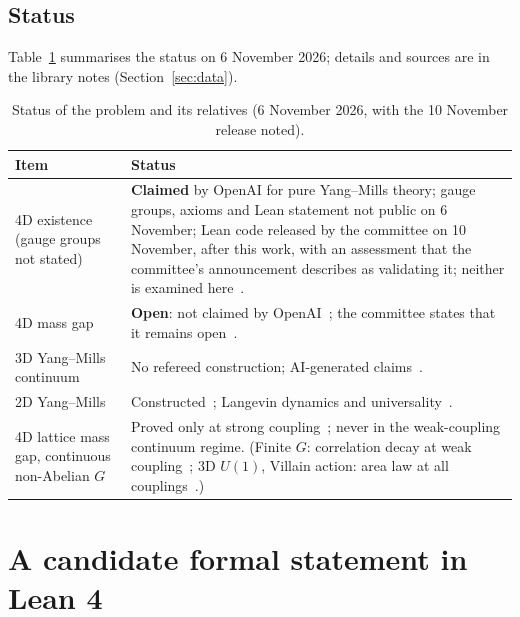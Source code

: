 \documentclass[11pt]{article}
\theoremstyle{definition}
\theoremstyle{remark}
\begin{document}
\subsection{Status}
Table~\ref{tab:status} summarises the status on 6 November 2026; details and sources are in the
library notes (Section~\ref{sec:data}).

\begin{table}[ht]
\centering\small
\begin{tabularx}{\textwidth}{@{}lX@{}}
\toprule
Item & Status \\
\midrule
4D existence (gauge groups not stated) & \textbf{Claimed} by OpenAI for pure Yang--Mills theory; gauge groups, axioms and Lean statement not public on 6 November; Lean code released by the committee on 10 November, after this work, with an assessment that the committee's announcement describes as validating it; neither is examined here~\cite{OpenAI2026p,Douglas2026e,Douglas2026d,Douglas2026g}. \\
4D mass gap & \textbf{Open}: not claimed by OpenAI~\cite{OpenAI2026p,Woit2026d}; the committee states that it remains open~\cite{Douglas2026e}. \\
3D Yang--Mills continuum & No refereed construction; AI-generated claims~\cite{Sussman2026,Aronow2026}. \\
2D Yang--Mills & Constructed~\cite{Driver1989,Gross1989,Sengupta1997,Levy2003,Chevyrev2019}; Langevin dynamics and universality~\cite{Chandra2022,Chevyrev2026b}. \\
4D lattice mass gap, continuous non-Abelian $G$ & Proved only at strong coupling~\cite{Osterwalder1978,Seiler1982,Shen2023}; never in the weak-coupling continuum regime. (Finite $G$: correlation decay at weak coupling~\cite{Adhikari2025}; 3D $U(1)$, Villain action: area law at all couplings~\cite{Gopfert1982}.) \\
\bottomrule
\end{tabularx}
\caption{Status of the problem and its relatives (6 November 2026, with the 10 November release noted).}
\label{tab:status}
\end{table}

\section{A candidate formal statement in Lean 4}\label{sec:statement}
\end{document}
